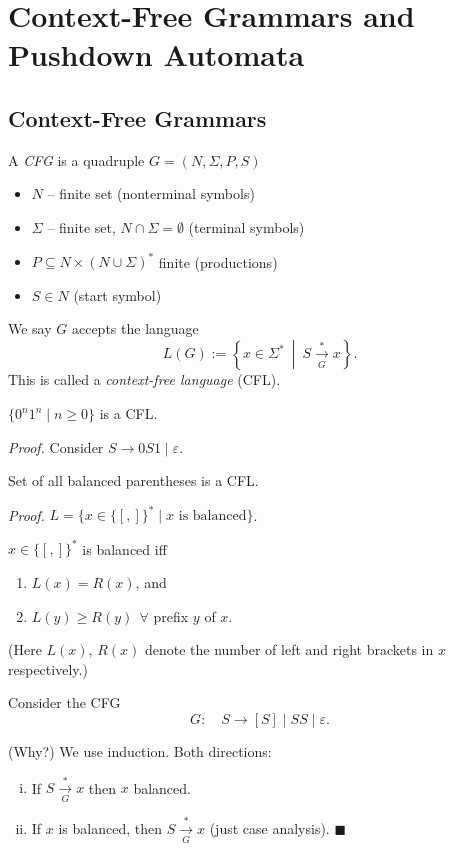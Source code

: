 \chapter{Context-Free Grammars and Pushdown Automata}

\section{Context-Free Grammars}

\begin{greybox}
\begin{definition}
A \emph{CFG} is a quadruple $G = (N, \Sigma, P, S)$
\begin{itemize}
    \item $N$ -- finite set (nonterminal symbols)
    \item $\Sigma$ -- finite set, $N \cap \Sigma = \emptyset$ (terminal symbols)
    \item $P \subseteq N \times (N \cup \Sigma)^*$ finite (productions)
    \item $S \in N$ (start symbol)
\end{itemize}
\end{definition}
\end{greybox}

We say $G$ accepts the language
\[
L(G) := \left\{ x \in \Sigma^* \ \middle|\ S \xrightarrow[G]{*} x \right\}.
\]
This is called a \emph{context-free language} (CFL).

\begin{example}
$\{0^n 1^n \mid n \geq 0\}$ is a CFL.

\noindent\textit{Proof.} Consider $S \to 0S1 \mid \varepsilon$.
\end{example}

\begin{example}
Set of all balanced parentheses is a CFL.

\noindent\textit{Proof.} $L = \{ x \in \{[,]\}^* \mid x \text{ is balanced} \}$.

\begin{greybox}
\begin{observation}
$x \in \{[,]\}^*$ is balanced iff
\begin{enumerate}[(1)]
    \item $L(x) = R(x)$, and
    \item $L(y) \geq R(y)\ \ \forall$ prefix $y$ of $x$.
\end{enumerate}
(Here $L(x)$, $R(x)$ denote the number of left and right brackets in $x$ respectively.)
\end{observation}
\end{greybox}

Consider the CFG
\[
G:\quad S \to [S] \mid SS \mid \varepsilon.
\]

(Why?) We use induction. Both directions:
\begin{enumerate}[(i)]
    \item If $S \xrightarrow[G]{*} x$ then $x$ balanced.
    \item If $x$ is balanced, then $S \xrightarrow[G]{*} x$ (just case analysis). \hfill$\blacksquare$
\end{enumerate}
\end{example}


